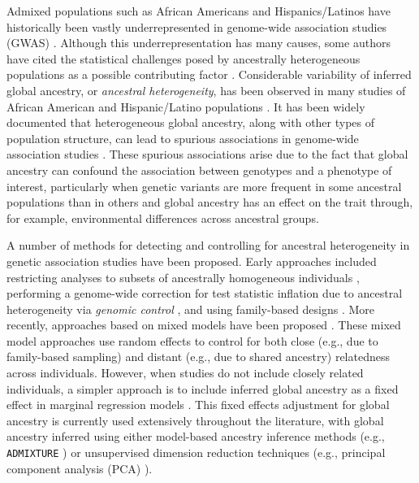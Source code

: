 \documentclass[12pt]{article}
\newcommand{\add}[1]{{\color{red}{[... #1 ...]}}}
\begin{document}
Admixed populations such as African Americans and Hispanics/Latinos have historically been vastly underrepresented in genome-wide association studies (GWAS) \cite{need2009, bustamante2011, popejoy2016, morales2018, sirugo2019, martin2019}. 
Although this underrepresentation has many causes, some authors have cited the statistical challenges posed by ancestrally heterogeneous populations as a possible contributing factor \citep{need2009, bustamante2011, popejoy2016}. 
\add{define global ancestry}
Considerable variability of inferred global ancestry, or \textit{ancestral heterogeneity}, has been observed in many studies of African American and Hispanic/Latino populations \citep{parra1998, tishkoff2009, bryc2010aa, bryc2010hl, conomos2016}.
It has been widely documented that heterogeneous global ancestry, along with other types of population structure, can lead to spurious associations in genome-wide association studies \citep{GenomicControl, eigenstrat, marchini2004, price2010}. 
These spurious associations arise due to the fact that global ancestry can confound the association between genotypes and a phenotype of interest, particularly when genetic variants are more frequent in some ancestral populations than in others  and global ancestry has an effect on the trait through, for example, environmental differences across ancestral groups. 

A number of methods for detecting and controlling for ancestral heterogeneity in genetic association studies have been proposed. 
Early approaches included restricting analyses to subsets of ancestrally homogeneous individuals \citep{lander1994}, performing a genome-wide correction for test statistic inflation due to ancestral heterogeneity via \textit{genomic control} \citep{GenomicControl}, and using family-based designs \citep{tdt}. 
More recently, approaches based on mixed models have been proposed \citep{yu2006, kang2010, yang2014}. 
These mixed model approaches use random effects to control for both close (e.g., due to family-based sampling) and distant (e.g., due to shared ancestry) relatedness across individuals.
However, when studies do not include closely related individuals, a simpler approach is to include inferred global ancestry as a fixed effect in marginal regression models \citep{eigenstrat, pritchard2000}. 
This fixed effects adjustment for global ancestry is currently used extensively throughout the literature, with global ancestry inferred using either model-based ancestry inference methods (e.g., \texttt{ADMIXTURE} \citep{admixture}) or unsupervised dimension reduction techniques (e.g., principal component analysis (PCA) \citep{eigenstrat}).
\end{document}
